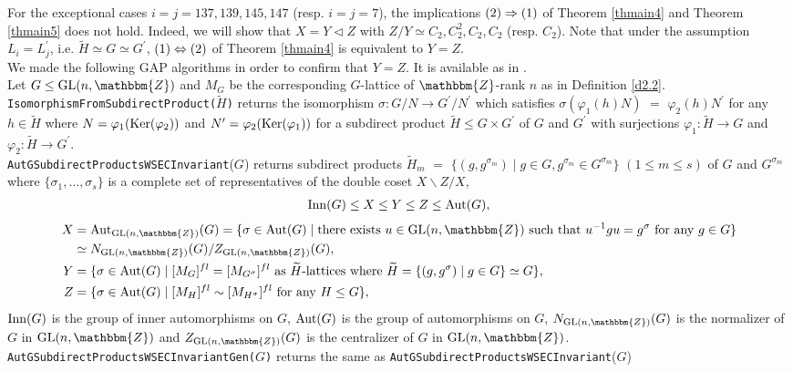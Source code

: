 \documentclass{amsart}
\theoremstyle{plain}
\theoremstyle{definition}
\theoremstyle{remark}
\newcommand{\bZ}{\mathbbm{Z}}\newcommand{\bQ}{\mathbbm{Q}}
\newcommand{\GL}{{\rm GL}}\newcommand{\SL}{{\rm SL}}
\newcounter{sub}\def\tr{\mbox{tr }}
\begin{document}
{{For the exceptional cases $i=j=137,139,145,147$ (resp. $i=j=7$), 
the implications ${\rm (2)}\Rightarrow {\rm (1)}$ of 
{Theorem \ref{thmain4}} and {Theorem \ref{thmain5}} 
does not hold. 
Indeed, we will show that 
$X=Y\lhd Z$ with $Z/Y\simeq C_2,C_2^2,C_2,C_2$ (resp. $C_2$). 
Note that under the assumption $L_i=L^\prime_j$, i.e. 
$\widetilde{H}\simeq G\simeq G^\prime$, 
${\rm (1)}\Leftrightarrow {\rm (2)}$ of Theorem \ref{thmain4} 
is equivalent to $Y=Z$.\\

We made the following GAP \cite{GAP} algorithms 
in order to confirm that $Y=Z$.  
It is available as in \cite{BCAlgTori}.\\

Let $G\leq \GL(n,\bZ)$ 
and $M_G$ be the corresponding $G$-lattice of $\bZ$-rank $n$ 
as in Definition \ref{d2.2}.\\

\noindent 
{\tt IsomorphismFromSubdirectProduct($\widetilde{H}$}{\tt)} 
returns the isomorphism $\sigma: G/N\rightarrow G^\prime/N^\prime$ 
which satisfies $\sigma(\varphi_1(h)N)$ $=$ $\varphi_2(h)N^\prime$ 
for any $h\in\widetilde{H}$ 
where $N=\varphi_1({\rm Ker}(\varphi_2))$ and 
$N^\prime=\varphi_2({\rm Ker}(\varphi_1))$ 
for a subdirect product 
$\widetilde{H}\leq G\times G^\prime$ of $G$ and $G^\prime$ 
with surjections $\varphi_1: \widetilde{H} \rightarrow G$ 
and $\varphi_2: \widetilde{H} \rightarrow G^\prime$.\\

\noindent 
{\tt AutGSubdirectProductsWSECInvariant}($G$)\tt } 
returns subdirect products 
$\widetilde{H}_m$ $=$ 
$\{(g,g^{\sigma_m})\mid g\in G, g^{\sigma_m}\in G^{\sigma_m}\}$ 
$(1\leq m\leq s)$ of $G$ and $G^{\sigma_m}$ 
where 
$\{\sigma_1,\ldots,\sigma_s\}$ is a complete set of representatives 
of the double coset $X\backslash Z/X$,  
\begin{align*}
{\rm Inn}(G)\leq X\leq Y\leq Z\leq {\rm Aut}(G), 
\end{align*}
\begin{align*}
X&={\rm Aut}_{\GL(n,\bZ)}(G)=
\{\sigma\in{\rm Aut}(G)\mid 
{\rm there}\ {\rm exists}\ u\in {\rm GL}(n,\bZ)\ {\rm such}\ {\rm that}\ 
u^{-1}gu=g^\sigma\ {\rm for}\ {\rm any}\ g\in G\}\\
&\simeq N_{\GL(n,\bZ)}(G)/Z_{\GL(n,\bZ)}(G),\\
Y&=\{\sigma\in{\rm Aut}(G)\mid [M_G]^{fl}=[M_{G^\sigma}]^{fl}\ {\rm as}\ 
\widetilde{H}\textrm{-lattices}\ {\rm where}\ \widetilde{H}=\{(g,g^\sigma)\mid g\in G\}\simeq G\},\\
Z&=\{\sigma\in{\rm Aut}(G)\mid [M_H]^{fl}\sim [M_{H^\sigma}]^{fl}\ {\rm for}\ {\rm any}\ H\leq G\},
\end{align*} 
${\rm Inn}(G)$ is the group of inner automorphisms on $G$, 
${\rm Aut}(G)$ is the group of automorphisms on $G$,  
$N_{\GL(n,\bZ)}(G)$ is the normalizer of $G$ in $\GL(n,\bZ)$ and 
$Z_{\GL(n,\bZ)}(G)$ is the centralizer of $G$ in $\GL(n,\bZ)$.\\

\noindent 
{\tt AutGSubdirectProductsWSECInvariantGen(}$G${\tt)}
returns the same as %
{\tt AutGSubdirectProductsWSECInvariant}($G$)\tt } 
\end{document}
